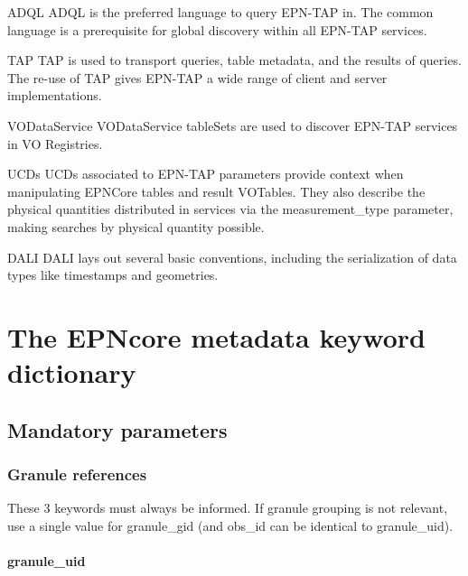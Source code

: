 \documentclass[11pt,a4paper]{ivoa}
\begin{document}
\begin{bigdescription}
\item[ADQL \citep{2008ivoa.spec.1030O}] ADQL is the preferred language to
query EPN-TAP in.  The common language is a prerequisite for global
discovery within all EPN-TAP services.
\item[TAP \citep{2019ivoa.spec.0927D}] TAP is used to transport queries,
table metadata, and the results of queries.  The re-use of TAP gives
EPN-TAP a wide range of client and server implementations.
\item[VODataService \citep{2010ivoa.spec.1202P}] VODataService tableSets
are used to discover EPN-TAP services in VO Registries.
\item[UCDs \citep{2021ivoa.spec.0616C}] UCDs associated to EPN-TAP
parameters provide context when manipulating EPNCore tables and result
VOTables. They also describe the physical quantities distributed in
services via the measurement\_type parameter, making searches by physical
quantity possible.
\item[DALI \citep{2017ivoa.spec.0517D}] DALI lays out several basic
conventions, including the serialization of data types like timestamps
and geometries.
\end{bigdescription}

\section{The EPNcore metadata keyword dictionary}

\subsection{Mandatory parameters}

\subsubsection{Granule references}

These 3 keywords must always be informed. If granule grouping is not
relevant, use a single value for granule\_gid (and obs\_id can be
identical to granule\_uid).

\paragraph{granule\_uid}
\end{document}
